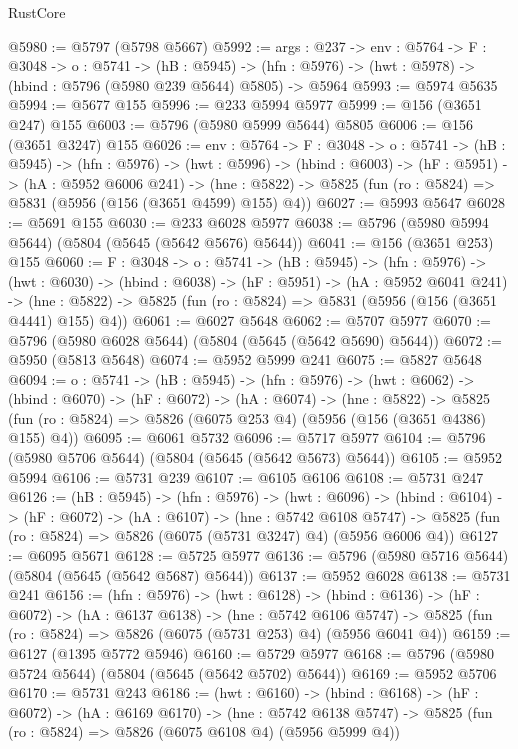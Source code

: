 \begin{lexlean}{RustCore}
\begin{coremodule}
@5980 := @5797 (@5798 @5667)
@5992 := {args : @237} ->
  {env : @5764} ->
  {F : @3048} ->
  {o : @5741} ->
  (hB : @5945) ->
  (hfn : @5976) -> (hwt : @5978) -> (hbind : @5796 (@5980 @239 @5644) @5805) -> @5964
@5993 := @5974 @5635
@5994 := @5677 @155
@5996 := @233 @5994 @5977
@5999 := @156 (@3651 @247) @155
@6003 := @5796 (@5980 @5999 @5644) @5805
@6006 := @156 (@3651 @3247) @155
@6026 := {env : @5764} ->
  {F : @3048} ->
  {o : @5741} ->
  (hB : @5945) ->
  (hfn : @5976) ->
  (hwt : @5996) ->
  (hbind : @6003) ->
  (hF : @5951) ->
  (hA : @5952 @6006 @241) ->
  (hne : @5822) -> @5825 (fun (ro : @5824) => @5831 (@5956 (@156 (@3651 @4599) @155) @4))
@6027 := @5993 @5647
@6028 := @5691 @155
@6030 := @233 @6028 @5977
@6038 := @5796 (@5980 @5994 @5644) (@5804 (@5645 (@5642 @5676) @5644))
@6041 := @156 (@3651 @253) @155
@6060 := {F : @3048} ->
  {o : @5741} ->
  (hB : @5945) ->
  (hfn : @5976) ->
  (hwt : @6030) ->
  (hbind : @6038) ->
  (hF : @5951) ->
  (hA : @5952 @6041 @241) ->
  (hne : @5822) -> @5825 (fun (ro : @5824) => @5831 (@5956 (@156 (@3651 @4441) @155) @4))
@6061 := @6027 @5648
@6062 := @5707 @5977
@6070 := @5796 (@5980 @6028 @5644) (@5804 (@5645 (@5642 @5690) @5644))
@6072 := @5950 (@5813 @5648)
@6074 := @5952 @5999 @241
@6075 := @5827 @5648
@6094 := {o : @5741} ->
  (hB : @5945) ->
  (hfn : @5976) ->
  (hwt : @6062) ->
  (hbind : @6070) ->
  (hF : @6072) ->
  (hA : @6074) ->
  (hne : @5822) ->
  @5825 (fun (ro : @5824) => @5826 (@6075 @253 @4) (@5956 (@156 (@3651 @4386) @155) @4))
@6095 := @6061 @5732
@6096 := @5717 @5977
@6104 := @5796 (@5980 @5706 @5644) (@5804 (@5645 (@5642 @5673) @5644))
@6105 := @5952 @5994
@6106 := @5731 @239
@6107 := @6105 @6106
@6108 := @5731 @247
@6126 := (hB : @5945) ->
  (hfn : @5976) ->
  (hwt : @6096) ->
  (hbind : @6104) ->
  (hF : @6072) ->
  (hA : @6107) ->
  (hne : @5742 @6108 @5747) ->
  @5825 (fun (ro : @5824) => @5826 (@6075 (@5731 @3247) @4) (@5956 @6006 @4))
@6127 := @6095 @5671
@6128 := @5725 @5977
@6136 := @5796 (@5980 @5716 @5644) (@5804 (@5645 (@5642 @5687) @5644))
@6137 := @5952 @6028
@6138 := @5731 @241
@6156 := (hfn : @5976) ->
  (hwt : @6128) ->
  (hbind : @6136) ->
  (hF : @6072) ->
  (hA : @6137 @6138) ->
  (hne : @5742 @6106 @5747) ->
  @5825 (fun (ro : @5824) => @5826 (@6075 (@5731 @253) @4) (@5956 @6041 @4))
@6159 := @6127 (@1395 @5772 @5946)
@6160 := @5729 @5977
@6168 := @5796 (@5980 @5724 @5644) (@5804 (@5645 (@5642 @5702) @5644))
@6169 := @5952 @5706
@6170 := @5731 @243
@6186 := (hwt : @6160) ->
  (hbind : @6168) ->
  (hF : @6072) ->
  (hA : @6169 @6170) ->
  (hne : @5742 @6138 @5747) -> @5825 (fun (ro : @5824) => @5826 (@6075 @6108 @4) (@5956 @5999 @4))

\end{coremodule}
\end{lexlean}
